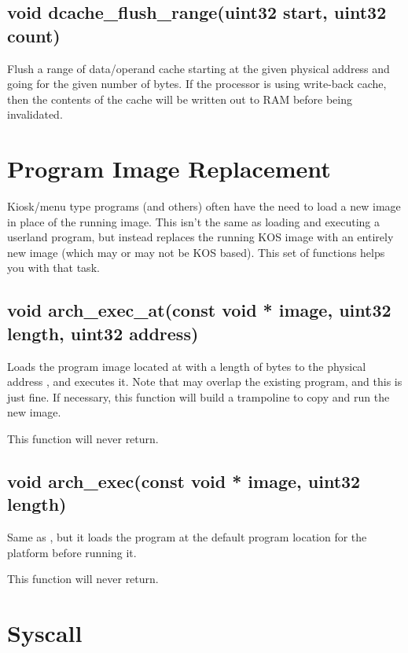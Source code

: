 \documentclass[english]{report}
\begin{document}
\subsection{void dcache\_flush\_range(uint32 start, uint32 count)}

Flush a range of data/operand cache starting at the given
physical address and going for the given number of bytes. If the
processor is using write-back cache, then the contents of the
cache will be written out to RAM before being invalidated.


\section{Program Image Replacement}

Kiosk/menu type programs (and others) often have the need to load
a new image in place of the running image. This isn't the same as
loading and executing a userland program, but instead replaces the
running KOS image with an entirely new image (which may or may not
be KOS based). This set of functions helps you with that task.

\subsection{void arch\_exec\_at(const void * image, uint32 length, uint32 address)}

Loads the program image located at  with a length
of  bytes to the physical address ,
and executes it. Note that  may overlap the existing
program, and this is just fine. If necessary, this function will build
a trampoline to copy and run the new image.

This function will never return.

\subsection{void arch\_exec(const void * image, uint32 length)}

Same as , but it loads the program at the
default program location for the platform before running it.

This function will never return.


\section{Syscall}
\end{document}
